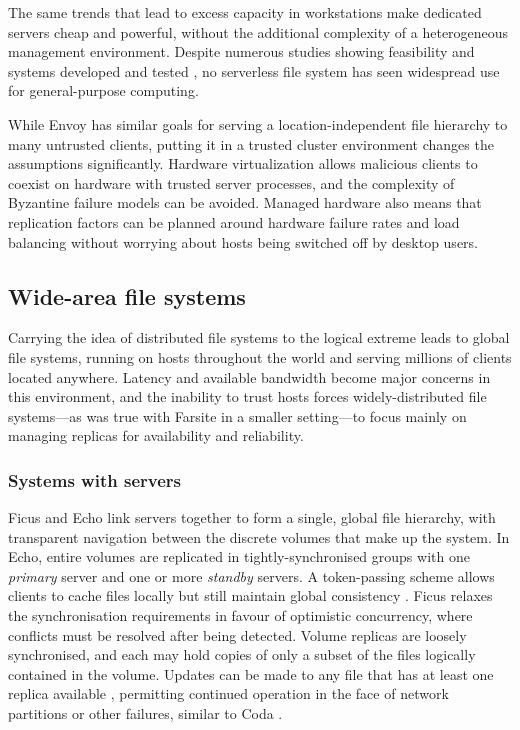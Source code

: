 The same trends that lead to excess capacity in workstations make dedicated servers cheap and powerful, without the additional complexity of a heterogeneous management environment. Despite numerous studies showing feasibility \cite{bolosky,douceur99,douceur01} and systems developed and tested \cite{adya,walker}, no serverless file system has seen widespread use for general-purpose computing.

While Envoy has similar goals for serving a location-independent file hierarchy to many untrusted clients, putting it in a trusted cluster environment changes the assumptions significantly. Hardware virtualization allows malicious clients to coexist on hardware with trusted server processes, and the complexity of Byzantine failure models can be avoided. Managed hardware also means that replication factors can be planned around hardware failure rates and load balancing without worrying about hosts being switched off by desktop users.

\subsection{Wide-area file systems}

Carrying the idea of distributed file systems to the logical extreme leads to global file systems, running on hosts throughout the world and serving millions of clients located anywhere. Latency and available bandwidth become major concerns in this environment, and the inability to trust hosts forces widely-distributed file systems---as was true with Farsite in a smaller setting---to focus mainly on managing replicas for availability and reliability.

\subsubsection{Systems with servers}

Ficus \cite{guy} and Echo \cite{birrell93} link servers together to form a single, global file hierarchy, with transparent navigation between the discrete volumes that make up the system. In Echo, entire volumes are replicated in tightly-synchronised groups with one \emph{primary} server and one or more \emph{standby} servers. A token-passing scheme allows clients to cache files locally but still maintain global consistency \cite{mann}. Ficus relaxes the synchronisation requirements in favour of optimistic concurrency, where conflicts must be resolved after being detected. Volume replicas are loosely synchronised, and each may hold copies of only a subset of the files logically contained in the volume. Updates can be made to any file that has at least one replica available \cite{popek}, permitting continued operation in the face of network partitions or other failures, similar to Coda \cite{kistler}.

